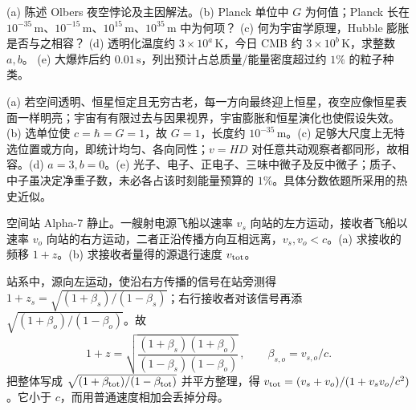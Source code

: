 \begin{exercise}
(a) 陈述 Olbers 夜空悖论及主因解法。(b) Planck 单位中 $G$ 为何值；Planck 长在 $10^{-35}\,\mathrm m$、$10^{-15}\,\mathrm m$、$10^{15}\,\mathrm m$、$10^{35}\,\mathrm m$ 中为何项？
(c) 何为宇宙学原理，Hubble 膨胀是否与之相容？
(d) 透明化温度约 $3\times10^a\,\mathrm K$，今日 CMB 约 $3\times10^b\,\mathrm K$，求整数 $a,b$。
(e) 大爆炸后约 $0.01\,\mathrm s$，列出预计占总质量/能量密度超过约 $1\%$ 的粒子种类。
\end{exercise}
\begin{solution}
(a) 若空间透明、恒星恒定且无穷古老，每一方向最终迎上恒星，夜空应像恒星表面一样明亮；宇宙有有限过去与因果视界，宇宙膨胀和恒星演化也使假设失效。(b) 选单位使 $c=\hbar=G=1$，故 $G=1$，长度约 $10^{-35}\,\mathrm m$。(c) 足够大尺度上无特选位置或方向，即统计均匀、各向同性；$v=HD$ 对任意共动观察者都同形，故相容。(d) $a=3,b=0$。(e) 光子、电子、正电子、三味中微子及反中微子；质子、中子虽决定净重子数，未必各占该时刻能量预算的 $1\%$。具体分数依题所采用的热史近似。
\end{solution}

\begin{exercise}
空间站 Alpha-7 静止。一艘射电源飞船以速率 $v_s$ 向站的左方运动，接收者飞船以速率 $v_o$ 向站的右方运动，二者正沿传播方向互相远离，$v_s,v_o<c$。(a) 求接收的频移 $1+z$。(b) 求接收者量得的源退行速度 $v_{\rm tot}$。
\end{exercise}
\begin{solution}
站系中，源向左运动，使沿右方传播的信号在站旁测得 $1+z_s=\sqrt{(1+\beta_s)/(1-\beta_s)}$；右行接收者对该信号再添 $\sqrt{(1+\beta_o)/(1-\beta_o)}$。故
\[
1+z=\sqrt{\frac{(1+\beta_s)(1+\beta_o)}
{(1-\beta_s)(1-\beta_o)}}\,,\qquad
\beta_{s,o}=v_{s,o}/c.
\]
把整体写成 $\sqrt{(1+\beta_{\rm tot})/(1-\beta_{\rm tot})}$ 并平方整理，得
$v_{\rm tot}=(v_s+v_o)/(1+v_sv_o/c^2)$。它小于 $c$，而用普通速度相加会丢掉分母。
\end{solution}

